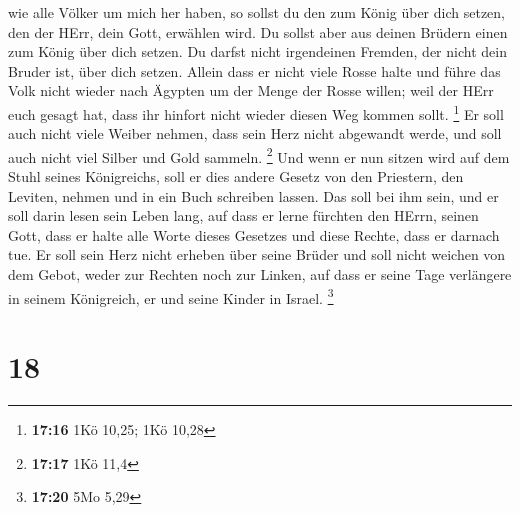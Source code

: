 wie alle Völker um mich her haben,  so sollst du den zum
König über dich setzen, den der HErr, dein Gott, erwählen wird. Du
sollst aber aus deinen Brüdern einen zum König über dich setzen. Du
darfst nicht irgendeinen Fremden, der nicht dein Bruder ist, über dich
setzen.  Allein dass er nicht viele Rosse halte und führe
das Volk nicht wieder nach Ägypten um der Menge der Rosse willen; weil
der HErr euch gesagt hat, dass ihr hinfort nicht wieder diesen Weg
kommen sollt. \footnote{\textbf{17:16} 1Kö 10,25; 1Kö 10,28}
 Er soll auch nicht viele Weiber nehmen, dass sein Herz
nicht abgewandt werde, und soll auch nicht viel Silber und Gold sammeln.
\footnote{\textbf{17:17} 1Kö 11,4}  Und wenn er nun
sitzen wird auf dem Stuhl seines Königreichs, soll er dies andere Gesetz
von den Priestern, den Leviten, nehmen und in ein Buch schreiben lassen.
 Das soll bei ihm sein, und er soll darin lesen sein
Leben lang, auf dass er lerne fürchten den HErrn, seinen Gott, dass er
halte alle Worte dieses Gesetzes und diese Rechte, dass er darnach tue.
 Er soll sein Herz nicht erheben über seine Brüder und
soll nicht weichen von dem Gebot, weder zur Rechten noch zur Linken, auf
dass er seine Tage verlängere in seinem Königreich, er und seine Kinder
in Israel. \footnote{\textbf{17:20} 5Mo 5,29}

\hypertarget{section-17}{%
\section{18}\label{section-17}}

